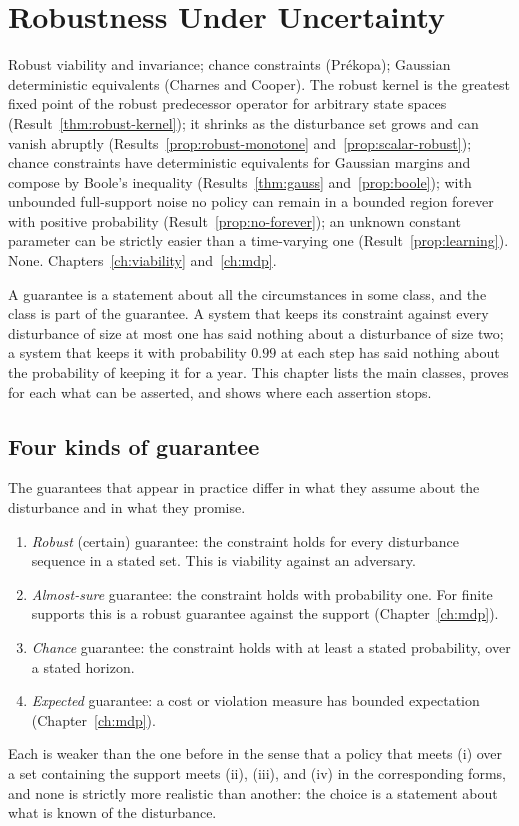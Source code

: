 \chapter{Robustness Under Uncertainty}\label{ch:robust}
{Robust viability and invariance; chance constraints (Pr\'ekopa); Gaussian deterministic equivalents (Charnes and Cooper).}
{The robust kernel is the greatest fixed point of the robust predecessor operator for arbitrary state spaces (Result~\ref{thm:robust-kernel}); it shrinks as the disturbance set grows and can vanish abruptly (Results~\ref{prop:robust-monotone} and~\ref{prop:scalar-robust}); chance constraints have deterministic equivalents for Gaussian margins and compose by Boole's inequality (Results~\ref{thm:gauss} and~\ref{prop:boole}); with unbounded full-support noise no policy can remain in a bounded region forever with positive probability (Result~\ref{prop:no-forever}); an unknown constant parameter can be strictly easier than a time-varying one (Result~\ref{prop:learning}).}
{None.}
{Chapters~\ref{ch:viability} and~\ref{ch:mdp}.}

A guarantee is a statement about all the circumstances in some class, and the class is part of the guarantee. A system that keeps its constraint against every disturbance of size at most one has said nothing about a disturbance of size two; a system that keeps it with probability $0.99$ at each step has said nothing about the probability of keeping it for a year. This chapter lists the main classes, proves for each what can be asserted, and shows where each assertion stops.

\section{Four kinds of guarantee}

The guarantees that appear in practice differ in what they assume about the disturbance and in what they promise.
\begin{enumerate}[nosep,label=(\roman*)]
  \item \emph{Robust} (certain) guarantee: the constraint holds for every disturbance sequence in a stated set. This is viability against an adversary.
  \item \emph{Almost-sure} guarantee: the constraint holds with probability one. For finite supports this is a robust guarantee against the support (Chapter~\ref{ch:mdp}).
  \item \emph{Chance} guarantee: the constraint holds with at least a stated probability, over a stated horizon.
  \item \emph{Expected} guarantee: a cost or violation measure has bounded expectation (Chapter~\ref{ch:mdp}).
\end{enumerate}
Each is weaker than the one before in the sense that a policy that meets (i) over a set containing the support meets (ii), (iii), and (iv) in the corresponding forms, and none is strictly more realistic than another: the choice is a statement about what is known of the disturbance.

